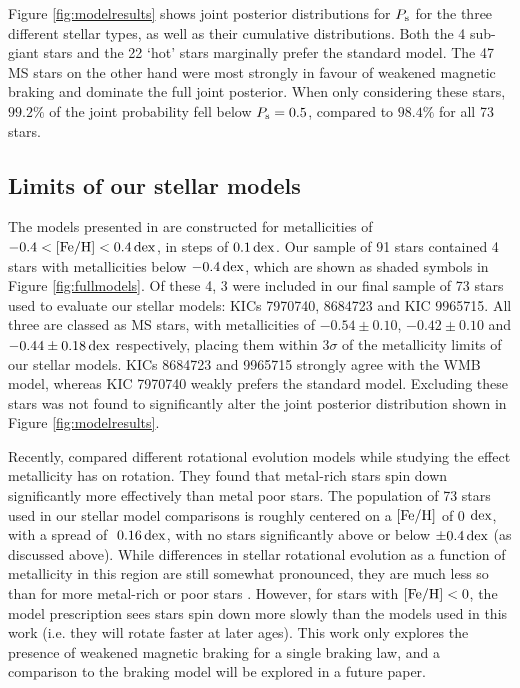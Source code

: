 \documentclass[12pt]{article}
\newcommand{\feh}{\mbox{$\rm{[Fe/H]}$}\xspace}
\begin{document}
Figure \ref{fig:modelresults} shows joint posterior distributions for $P_{\rm s}$ for the three different stellar types, as well as their cumulative distributions. Both the  4 sub-giant stars and the 22 `hot' stars marginally prefer the standard model. The 47 MS stars on the other hand were most strongly in favour of weakened magnetic braking and dominate the full joint posterior. When only considering these stars, $99.2\%$ of the joint probability fell below $P_{\rm{s}} = 0.5$, compared to $98.4\%$ for all 73 stars.

\subsection{Limits of our stellar models}\label{ssec:limits}
The models presented in \cite{vansaders+2019} are constructed for metallicities of $-0.4 < \rm{[Fe/H]} < 0.4\, \rm{dex}$, in steps of $0.1\, \rm {dex}$. Our sample of 91 stars contained 4 stars with metallicities below $-0.4\, \rm{dex}$, which are shown as shaded symbols in Figure \ref{fig:fullmodels}. Of these 4, 3 were included in our final sample of 73 stars used to evaluate our stellar models: KICs 7970740, 8684723 and KIC 9965715. All three are classed as MS stars, with metallicities of $-0.54 \pm 0.10$, $-0.42 \pm 0.10$ and $-0.44 \pm 0.18\, \rm {dex}$ respectively, placing them within $3\sigma$ of the metallicity limits of our stellar models. KICs 8684723 and 9965715 strongly agree with the WMB model, whereas KIC 7970740 weakly prefers the standard model. Excluding these stars was not found to significantly alter the joint posterior distribution shown in Figure \ref{fig:modelresults}.

Recently, \cite{amard+matt2020} compared different rotational evolution models \cite[][of which we use the former in this work]{vansaders+pinsonneault2013,matt+2015} while studying the effect metallicity has on rotation. They found that metal-rich stars spin down significantly more effectively than metal poor stars. The population of 73 stars used in our stellar model comparisons is roughly centered on a $\rm{[Fe/H]}$ of 0 $\rm dex$, with a spread of $~0.16\, \rm dex$, with no stars significantly above or below $\pm 0.4\, \rm dex$ (as discussed above). While differences in stellar rotational evolution as a function of metallicity in this region are still somewhat pronounced, they are much less so than for more metal-rich or poor stars \cite[see Figure 2][]{amard+matt2020}. However, for stars with $\feh < 0$, the \cite{matt+2015} model prescription sees stars spin down more slowly than the models used in this work (i.e. they will rotate faster at later ages). This work only explores the presence of weakened magnetic braking for a single braking law, and a comparison to the \cite{matt+2015} braking model will be explored in a future paper.
\end{document}

